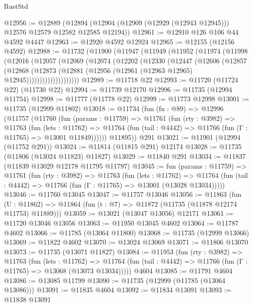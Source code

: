 \begin{lexlean}{RustStd}
\begin{coremodule}
{\begin{coremodule}
{{{{{{{{{{{{{{{{{{{{{{{{{{{{{{{{{{{{{{{{{{{{{{{{{{{{{{{{{{{{{{{{{{{{@12956 := @12889
    (@12894 (@12904 (@12909 (@12929 (@12943 @12945))) @12576 @12579 @12582 @12585 @12194))
@12961 := @12910 @126 @106 @44 @4592 @4447
@12963 := @12920 @4592 @12924
@12965 := @12155 (@12156 @4592)
@12988 := @11732
    (@11900
      (@11947
        (@11949
          (@11952
            (@11974
              (@11998
                (@12016
                  (@12057
                    (@12069
                      (@12074
                        (@12202
                          (@12330
                            (@12447
                              (@12606
                                (@12857
                                  (@12868
                                    (@12873
                                      (@12881
                                        (@12956 (@12961 (@12963 @12965) @12945))))))))))))))))))))
@12989 := @11718 @22
@12993 := @11720 (@11724 @22) (@11730 @22)
@12994 := @11739 @12170
@12996 := @11735 (@12994 @11754)
@12998 := @11777 (@11778 @22)
@12999 := @11773 @12998
@13001 := @11735 (@12999 @11802)
@13018 := @11734
    (fun (fn : @89) =>
    @12996
      (@11757
        (@11760
          (fun (params : @11759) =>
          @11761
            (fun (rty : @3982) =>
            @11763
              (fun (lets : @11762) =>
              @11764 (fun (tail : @4442) => @11766 (fun (Γ : @11765) => @13001 @11849))))))
        @11895))
    @291
@13021 := @11901 (@12994 (@11752 @291))
@13024 := @11814 (@11815 @291) @12174
@13028 := @11735 (@11806 (@13024 @11823) @11827)
@13029 := @11840 @291
@13034 := @11837 (@11839 @13029 @12178 @11795 @11797)
@13045 := fun (params : @11759) =>
  @11761
    (fun (rty : @3982) =>
    @11763
      (fun (lets : @11762) =>
      @11764 (fun (tail : @4442) => @11766 (fun (Γ : @11765) => @13001 (@13028 @13034)))))
@13046 := @11760 @13045
@13047 := @11757 @13046
@13056 := @11863
    (fun (U : @11862) => @11864 (fun (t : @7) => @11872 (@11735 (@11878 @12174 @11753) @11889)))
@13059 := @13021 (@13047 @13056) @12171
@13061 := @11720 @13046 @13056
@13063 := @11950 @13045 @4602
@13064 := @11787 @4602
@13066 := @11785 (@13064 @11800)
@13068 := @11735 (@12999 @13066)
@13069 := @11822 @4602
@13070 := @13024 @13069
@13071 := @11806 @13070
@13073 := @11735 (@13071 @11827)
@13084 := @11953
    (fun (rty : @3982) =>
    @11763
      (fun (lets : @11762) =>
      @11764 (fun (tail : @4442) => @11766 (fun (Γ : @11765) => @13068 (@13073 @13034)))))
    @4604
@13085 := @11791 @4604
@13086 := @13085 @11799
@13090 := @11735 (@12999 (@11785 (@13064 @13086)))
@13091 := @11835 @4604
@13092 := @11834 @13091
@13093 := @11838 @13091
}}}}}}}}}}}}}}}}}}}}}}}}}}}}}}}}}}}}}}}}}}}}}}}}}}}}}}}}}}}}}}}}}}}}
\end{coremodule}}
\end{coremodule}
\end{lexlean}
